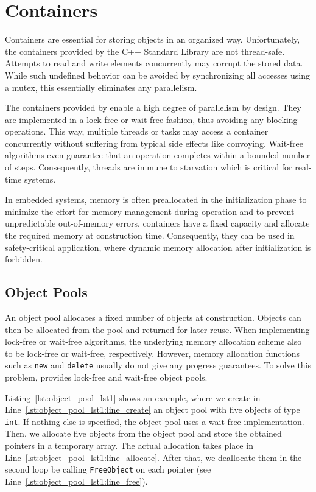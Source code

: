 \chapter{Containers}
\label{cha:containers}

Containers are essential for storing objects in an organized way. Unfortunately, the containers provided by the C++ Standard Library are not thread-safe. Attempts to read and write elements concurrently may corrupt the stored data. While such undefined behavior can be avoided by synchronizing all accesses using a mutex, this essentially eliminates any parallelism.

The containers provided by \embb enable a high degree of parallelism by design. They are implemented in a lock-free or wait-free fashion, thus avoiding any blocking operations. This way, multiple threads or tasks may access a container concurrently without suffering from typical side effects like convoying. Wait-free algorithms even guarantee that an operation completes within a bounded number of steps. Consequently, threads are immune to starvation which is critical for real-time systems.

In embedded systems, memory is often preallocated in the initialization phase to minimize the effort for memory management during operation and to prevent unpredictable out-of-memory errors. \embb containers have a fixed capacity and allocate the required memory at construction time. Consequently, they can be used in safety-critical application, where dynamic memory allocation after initialization is forbidden.

\section{Object Pools}
\label{sec:containers_object_pools}

An object pool allocates a fixed number of objects at construction. Objects can then be allocated from the pool and returned for later reuse. When implementing lock-free or wait-free algorithms, the underlying memory allocation scheme also to be lock-free or wait-free, respectively. However, memory allocation functions such as \lstinline|new| and \lstinline|delete| usually do not give any progress guarantees. To solve this problem, \embb provides lock-free and wait-free object pools.

Listing~\ref{lst:object_pool_lst1} shows an example, where we create in Line~\ref{lst:object_pool_lst1:line_create} an object pool with five objects of type \lstinline|int|. If nothing else is specified, the object-pool uses a wait-free implementation. Then, we allocate five objects from the object pool and store the obtained pointers in a temporary array. The actual allocation takes place in Line~\ref{lst:object_pool_lst1:line_allocate}. After that, we deallocate them in the second loop be calling \lstinline|FreeObject| on each pointer (see Line~\ref{lst:object_pool_lst1:line_free}).

